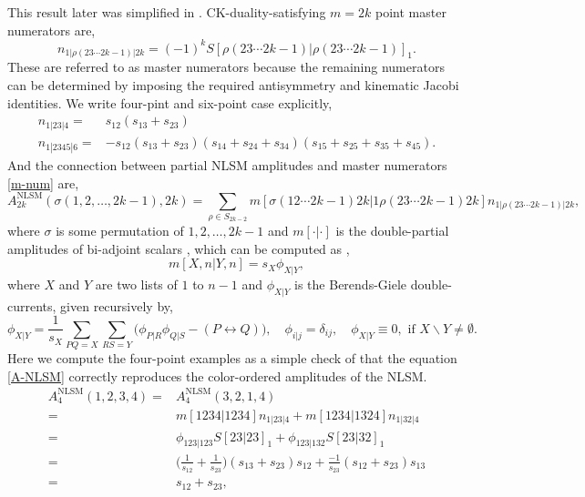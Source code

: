 \documentclass[a4paper,11pt]{article}
\begin{document}
This result later was simplified in \cite{Carrasco:2016ldy}. CK-duality-satisfying $m=2k$ point master numerators are,
\begin{equation}\label{m-num}
    n_{1|\rho(23\cdots 2k-1)|2k}=(-1)^{k}S[\rho(23\cdots 2k-1)|\rho(23\cdots 2k-1)]_1.
\end{equation}
These are referred to as master numerators because the remaining numerators can be determined by imposing the required antisymmetry and kinematic Jacobi identities.
We write four-pint and six-point case explicitly,
\begin{align}
n_{1|23|4}=&s_{12}(s_{13}+s_{23}) \\
n_{1|2345|6}=&-s_{12}(s_{13}+s_{23})(s_{14}+s_{24}+s_{34})(s_{15}+s_{25}+s_{35}+s_{45}).
\end{align}
And the connection between partial NLSM amplitudes and master numerators \eqref{m-num} are,
\begin{equation}\label{A-NLSM}
    A_{2k}^{\text{NLSM}}(\sigma(1,2,\dots,2k-1),2k)=\sum_{\rho\in S_{2k-2}}m[\sigma(12\cdots 2k-1)2k|1\rho(23\cdots 2k-1)2k]n_{1|\rho(23\cdots 2k-1)|2k},
\end{equation}
where $\sigma$ is some permutation of $1,2,\dots,2k-1$ and $m[\cdot|\cdot]$ is the double-partial amplitudes of bi-adjoint scalars \cite{Cachazo:2013iea},
which can be computed as \cite{Mafra:2016ltu},
\begin{equation}
    m[X,n|Y,n]=s_{X}\phi_{X|Y},
\end{equation}
where $X$ and $Y$ are two lists of $1$ to $n-1$ and $\phi_{X|Y}$ is the Berends-Giele double-currents, given recursively by,
\begin{equation}
    \phi_{X|Y}=\frac{1}{s_{X}}\sum_{PQ=X}\sum_{RS=Y}\big(\phi_{P|R}\phi_{Q|S}-(P\leftrightarrow Q)\big),\quad \phi_{i|j}=\delta_{ij},\quad \phi_{X|Y}\equiv 0,\text{ if }X\backslash Y\neq\emptyset.
\end{equation}
Here we compute the four-point examples as a simple check of that the equation \eqref{A-NLSM} correctly reproduces the color-ordered amplitudes of the NLSM.
\begin{equation}
    \begin{split}
    A_4^{\text{NLSM}}(1,2,3,4)=&A_4^{\text{NLSM}}(3,2,1,4)\\
    =&m[1234|1234]n_{1|23|4}+m[1234|1324]n_{1|32|4}\\
    =&\phi_{123|123}S[23|23]_1+\phi_{123|132}S[23|32]_1\\
    =&\Big(\frac{1}{s_{12}}+\frac{1}{s_{23}}\Big)(s_{13}+s_{23})s_{12}+\frac{-1}{s_{23}}(s_{12}+s_{23})s_{13}\\
    =&s_{12}+s_{23},
    \end{split}
\end{equation}
\end{document}
